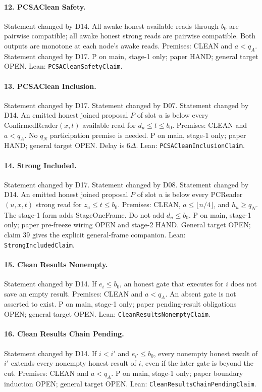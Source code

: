 \documentclass{article}
\newcommand{\nm}[1]{\nolinkurl{#1}}
\begin{document}
\paragraph{12. PCSAClean Safety.}
Statement changed by D14.
All awake honest available reads through $b_0$ are pairwise compatible; all awake honest strong reads are pairwise compatible. Both outputs are monotone at each node's awake reads. Premises: CLEAN and $a<q_A$. Statement changed by D17. P on main, stage-1 only; paper HAND; general target OPEN.
Lean: \nm{PCSACleanSafetyClaim}.

\paragraph{13. PCSAClean Inclusion.}
Statement changed by D17.
Statement changed by D07. Statement changed by D14.
An emitted honest joined proposal $P$ of slot $u$ is below every ConfirmedReader$(x,t)$ available read for $d_u\leq t\leq b_0$. Premises: CLEAN and $a<q_A$. No $q_N$ participation premise is needed. P on main, stage-1 only; paper HAND; general target OPEN. Delay is $6\Delta$.
Lean: \nm{PCSACleanInclusionClaim}.

\paragraph{14. Strong Included.}
Statement changed by D17.
Statement changed by D08. Statement changed by D14.
An emitted honest joined proposal $P$ of slot $u$ is below every PCReader$(u,x,t)$ strong read for $z_u\leq t\leq b_0$. Premises: CLEAN, $a\leq\lfloor n/4\rfloor$, and $h_u\geq q_N$. The stage-1 form adds StageOneFrame. Do not add $d_u\leq b_0$. P on main, stage-1 only; paper pre-freeze wiring OPEN and stage-2 HAND. General target OPEN; claim 39 gives the explicit general-frame companion.
Lean: \nm{StrongIncludedClaim}.

\paragraph{15. Clean Results Nonempty.}
Statement changed by D14.
If $e_i\leq b_0$, an honest gate that executes for $i$ does not save an empty result. Premises: CLEAN and $a<q_A$. An absent gate is not asserted to exist. P on main, stage-1 only; paper pending-result obligations OPEN; general target OPEN.
Lean: \nm{CleanResultsNonemptyClaim}.

\paragraph{16. Clean Results Chain Pending.}
Statement changed by D14.
If $i<i'$ and $e_{i'}\leq b_0$, every nonempty honest result of $i'$ extends every nonempty honest result of $i$, even if the later gate is beyond the cut. Premises: CLEAN and $a<q_A$. P on main, stage-1 only; paper boundary induction OPEN; general target OPEN.
Lean: \nm{CleanResultsChainPendingClaim}.
\end{document}
